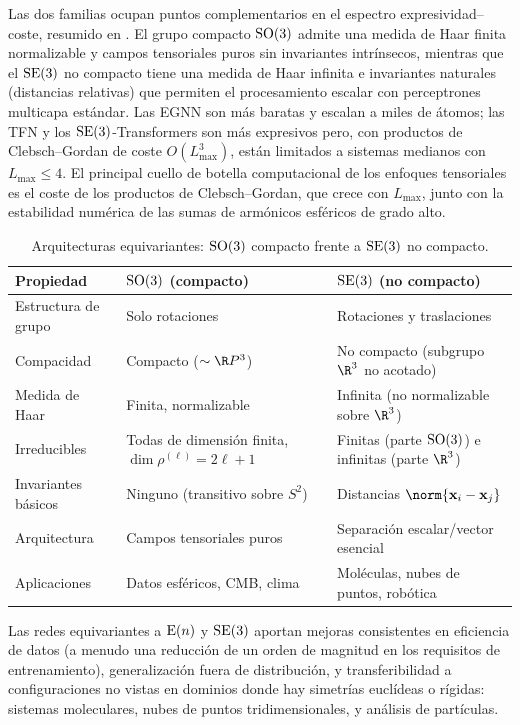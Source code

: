 Las dos familias ocupan puntos complementarios en el espectro
expresividad--coste, resumido en . El grupo compacto
$\operatorname{SO}(3)$ admite una medida de Haar finita normalizable y campos tensoriales puros
sin invariantes intr\'insecos, mientras que el $\operatorname{SE}(3)$ no compacto tiene una
medida de Haar infinita e invariantes naturales (distancias relativas) que
permiten el procesamiento escalar con perceptrones multicapa est\'andar. Las EGNN
son m\'as baratas y escalan a miles de \'atomos; las TFN y los
$\operatorname{SE}(3)$-Transformers son m\'as expresivos pero, con productos de Clebsch--Gordan
de coste $O(L_{\max}^3)$, est\'an limitados a sistemas medianos con $L_{\max} \leq
4$. El principal cuello de botella computacional de los enfoques tensoriales es el
coste de los productos de Clebsch--Gordan, que crece con $L_{\max}$, junto con la
estabilidad num\'erica de las sumas de arm\'onicos esf\'ericos de grado alto.

\begin{table}[h]
\centering
\caption{Arquitecturas equivariantes: $\operatorname{SO}(3)$ compacto frente a $\operatorname{SE}(3)$ no
compacto.}
\label{tab:groups:so3-vs-se3}
\begin{tabular}{@{}lp{4.6cm}p{4.6cm}@{}}
\toprule
\textbf{Propiedad} & \textbf{$\operatorname{SO}(3)$ (compacto)} & \textbf{$\operatorname{SE}(3)$ (no compacto)} \\
\midrule
Estructura de grupo & Solo rotaciones & Rotaciones y traslaciones \\
\addlinespace
Compacidad & Compacto ($\sim \R P^3$) & No compacto (subgrupo $\R^3$ no acotado) \\
\addlinespace
Medida de Haar & Finita, normalizable & Infinita (no normalizable sobre $\R^3$) \\
\addlinespace
Irreducibles & Todas de dimensi\'on finita, $\dim \rho^{(\ell)} = 2\ell+1$ & Finitas (parte $\operatorname{SO}(3)$) e infinitas (parte $\R^3$) \\
\addlinespace
Invariantes b\'asicos & Ninguno (transitivo sobre $S^2$) & Distancias $\norm{\mathbf{x}_i - \mathbf{x}_j}$ \\
\addlinespace
Arquitectura & Campos tensoriales puros & Separaci\'on escalar/vector esencial \\
\addlinespace
Aplicaciones & Datos esf\'ericos, CMB, clima & Mol\'eculas, nubes de puntos, rob\'otica \\
\bottomrule
\end{tabular}
\end{table}

Las redes equivariantes a $\operatorname{E}(n)$ y $\operatorname{SE}(3)$ aportan mejoras consistentes en
eficiencia de datos (a menudo una reducci\'on de un orden de magnitud en los
requisitos de entrenamiento), generalizaci\'on fuera de distribuci\'on, y
transferibilidad a configuraciones no vistas en dominios donde hay simetr\'ias
eucl\'ideas o r\'igidas: sistemas moleculares, nubes de puntos tridimensionales,
y an\'alisis de part\'iculas.

